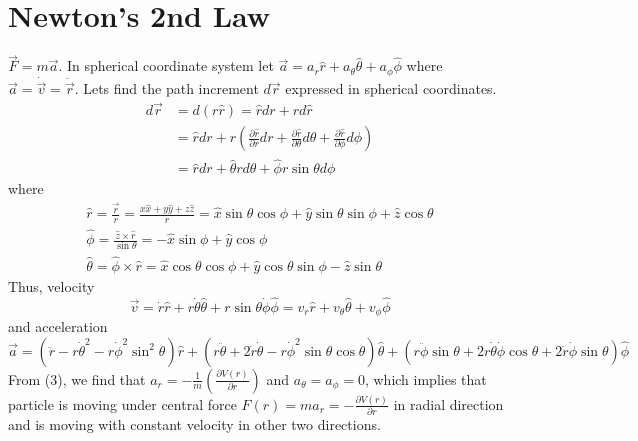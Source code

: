 \documentclass[conference]{IEEEtran}
\begin{document}
\section{\large{\textbf{Newton's 2nd Law}}}
$\vec{F} = m\vec{a}$. In spherical coordinate system let $\vec{a} = a_{r}\hat{r} + a_{\theta}\hat{\theta} + a_{\phi}\hat{\phi}$ where $\vec{a} = \dot{\vec{v}} = \ddot{\vec{r}}$. Lets find the path increment $d\vec{r}$ expressed in spherical coordinates.
\begin{equation}
\begin{aligned}
d \vec{r} &=d(r \hat{r})=\hat{r} d r+r d \hat{r} \\
&=\hat{r} d r+r\left(\frac{\partial \hat{r}}{\partial r} d r+\frac{\partial \hat{r}}{\partial \theta} d \theta+\frac{\partial \hat{r}}{\partial \phi} d \phi\right) \\
&=\hat{r} d r+\hat{\theta} r d \theta+\hat{\phi} r \sin \theta d \phi
\end{aligned}
\end{equation}
where \begin{equation}
\begin{array}{l}
\hat{r}=\frac{\vec{r}}{r}=\frac{x\hat{x}+y\hat{y}+z\hat{z}}{r} =\hat{x} \sin \theta \cos \phi+\hat{y} \sin \theta \sin \phi+\hat{z} \cos \theta \\
\hat{\phi}=\frac{\hat{z} \times \hat{r}}{\sin \theta}=-\hat{x} \sin \phi+\hat{y} \cos \phi \\
\hat{\theta}=\hat{\phi} \times \hat{r}=\hat{x} \cos \theta \cos \phi+\hat{y} \cos \theta \sin \phi-\hat{z} \sin \theta
\end{array}
\end{equation}
Thus, velocity \begin{equation}\vec{v} =\dot{r}\hat{r}+ r\dot{\theta}\hat{\theta}+ r\sin \theta\dot{\phi}\hat{\phi} = v_{r}\hat{r} + v_{\theta}\hat{\theta} + v_{\phi}\hat{\phi}\end{equation} and acceleration \begin{dmath}
\vec{a}=\left(\ddot{r}-r \dot{\theta}^{2}-r \dot{\phi}^{2} \sin ^{2} \theta\right)\hat{r}+\left(r \ddot{\theta}+2 \dot{r} \dot{\theta}-r \dot{\phi}^{2} \sin \theta \cos \theta\right)\hat{\theta} + \left(r \ddot{\phi} \sin \theta+2 r \dot{\theta} \dot{\phi} \cos \theta+2 \dot{r} \dot{\phi} \sin \theta\right)\hat{\phi}
\end{dmath}
From (3), we find that $a_{r} = - \frac{1}{m}\left(\frac{\partial V(r)}{\partial r}\right)$ and $a_{\theta} = a_{\phi} = 0$, which implies that particle is moving under central force $F(r) = ma_{r} = -\frac{\partial V(r)}{\partial r}$ in radial direction and is moving with constant velocity in other two directions. 
\vspace{1em}
\end{document}
